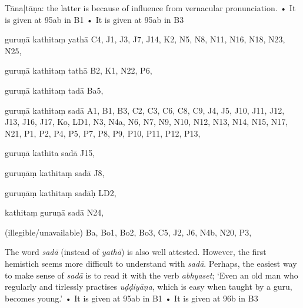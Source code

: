 \begin{marma}[hp03_061]
    \begin{description}
      Tāna|tāṇa: the latter is because of influence from vernacular pronunciation.
    • It is given at 95ab in B1
    • It is given at 95ab in B3
    \end{description}

\end{marma}


\begin{marma}[hp03_062]


\item[guruṇā kathitaṃ yathā] C4, J1, J3, J7, J14, K2, N5, N8, N11, N16, N18, N23, N25, 
\item[guruṇā kathitaṃ tathā] B2, K1, N22, P6, 
\item[guruṇā kathitaṃ tadā] Ba5, 
\item[guruṇā kathitaṃ sadā] A1, B1, B3, C2, C3, C6, C8, C9, J4, J5, J10, J11, J12, J13, J16, J17, Ko, LD1, N3, N4a, N6, N7, N9, N10, N12, N13, N14, N15, N17, N21, P1, P2, P4, P5, P7, P8, P9, P10, P11, P12, P13, 
\item[guruṇā kathita sadā] J15,
\item[guruṇāṃ kathitaṃ sadā] J8,
\item[guruṇāṃ kathitaṃ sadāḥ] LD2,
\item[kathitaṃ guruṇā sadā] N24,
\item[(illegible/unavailable)] Ba, Bo1, Bo2, Bo3, C5, J2, J6, N4b, N20, P3,

  \begin{description}
    The word \emph{sadā} (instead of \emph{yathā}) is also well attested. However, the first hemistich seems more difficult to understand with  \emph{sadā}. Perhaps, the easiest way to make sense of \emph{sadā} is to read it with the verb \emph{abhyaset}; `Even an old man who regularly and tirlessly practises \emph{uḍḍiyāṇa}, which is easy when taught by a guru, becomes young.'
    • It is given at 95ab in B1
    • It is given at 96b in B3

  \end{description}

\end{marma}


